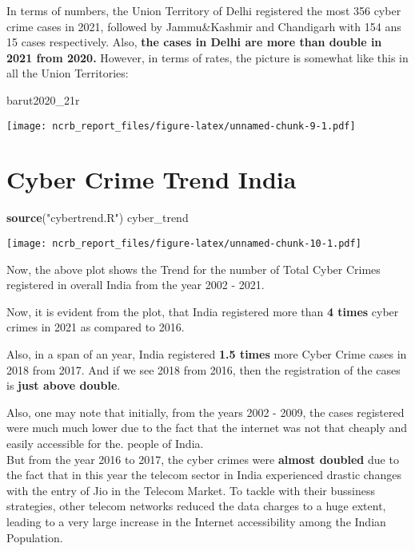 \documentclass[
  12,
  a4paper,
]{report}
\newenvironment{Shaded}{\begin{snugshade}}{\end{snugshade}}
\newcommand{\FunctionTok}[1]{\textcolor[rgb]{0.13,0.29,0.53}{\textbf{#1}}}
\newcommand{\NormalTok}[1]{#1}
\newcommand{\StringTok}[1]{\textcolor[rgb]{0.31,0.60,0.02}{#1}}
\begin{document}
In terms of numbers, the Union Territory of Delhi registered the most
356 cyber crime cases in 2021, followed by Jammu\&Kashmir and Chandigarh
with 154 ans 15 cases respectively. Also, \textbf{the cases in Delhi are
more than double in 2021 from 2020.} However, in terms of rates, the
picture is somewhat like this in all the Union Territories:

\begin{Shaded}
\begin{Highlighting}[]
\NormalTok{barut2020\_21r}
\end{Highlighting}
\end{Shaded}

\texttt{[image: ncrb\_report\_files/figure-latex/unnamed-chunk-9-1.pdf]}

\hypertarget{cyber-crime-trend-india}{%
\section{Cyber Crime Trend India}\label{cyber-crime-trend-india}}

\begin{Shaded}
\begin{Highlighting}[]
\FunctionTok{source}\NormalTok{(}\StringTok{"cybertrend.R"}\NormalTok{)}
\NormalTok{cyber\_trend}
\end{Highlighting}
\end{Shaded}

\texttt{[image: ncrb\_report\_files/figure-latex/unnamed-chunk-10-1.pdf]}

Now, the above plot shows the Trend for the number of Total Cyber Crimes
registered in overall India from the year 2002 - 2021.

Now, it is evident from the plot, that India registered more than
\textbf{4 times} cyber crimes in 2021 as compared to 2016.

Also, in a span of an year, India registered \textbf{1.5 times} more
Cyber Crime cases in 2018 from 2017. And if we see 2018 from 2016, then
the registration of the cases is \textbf{just above double}.

Also, one may note that initially, from the years 2002 - 2009, the cases
registered were much much lower due to the fact that the internet was
not that cheaply and easily accessible for the. people of India.\\
But from the year 2016 to 2017, the cyber crimes were \textbf{almost
doubled} due to the fact that in this year the telecom sector in India
experienced drastic changes with the entry of Jio in the Telecom Market.
To tackle with their bussiness strategies, other telecom networks
reduced the data charges to a huge extent, leading to a very large
increase in the Internet accessibility among the Indian Population.
\end{document}
